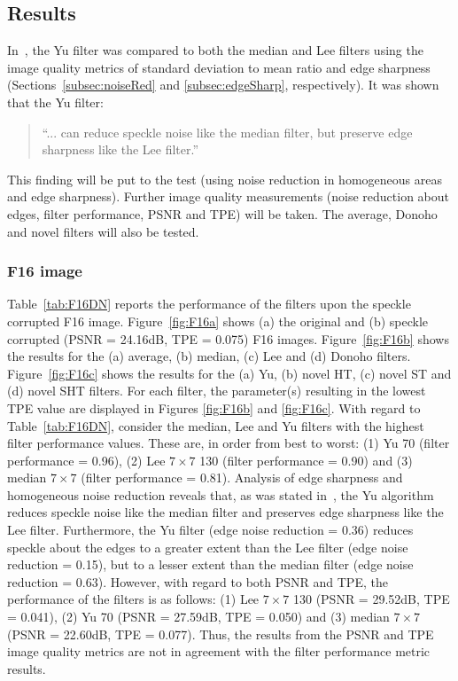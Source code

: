 \documentclass[12pt]{report}
\begin{document}
\subsection{Results}
In~\cite{yu96}, the Yu filter was compared to both the median and Lee filters using the image
quality metrics of standard deviation to mean ratio and edge sharpness (Sections~\ref{subsec:noiseRed} and \ref{subsec:edgeSharp}, respectively).
It was shown that the Yu filter: 
\begin{quote}
``... can reduce speckle noise like the median filter, but preserve edge sharpness like the Lee filter.''
\end{quote}
This finding will be put to the test 
(using noise reduction in homogeneous areas and edge sharpness).
Further image quality measurements 
(noise reduction about edges, filter performance,
PSNR and TPE) will be taken. The average, Donoho and novel filters will also be tested.

\subsubsection{F16 image}
Table~\ref{tab:F16DN} reports the performance of the filters upon the speckle corrupted F16 image.
Figure~\ref{fig:F16a} shows (a) the original and (b) speckle corrupted (PSNR = 24.16dB, TPE = 0.075) F16 images.
Figure~\ref{fig:F16b} shows the results for the (a) average, (b) median, (c) Lee and (d) Donoho filters. 
Figure~\ref{fig:F16c} shows the results for the (a) Yu, (b) novel HT, (c) novel ST and (d) novel SHT filters.
For each filter, the parameter(s) resulting in the lowest TPE value are displayed in 
Figures \ref{fig:F16b} and \ref{fig:F16c}.
With regard to Table~\ref{tab:F16DN}, consider the median, Lee and Yu filters with the highest filter performance values.
These are, in order from best to worst: (1) Yu 70 (filter performance = 0.96), 
(2) Lee $7 \times 7$ 130 (filter performance = 0.90) 
and (3) median $7 \times 7$ (filter performance = 0.81). 
Analysis of edge sharpness and homogeneous noise reduction reveals that, 
as was stated in~\cite{yu96}, the Yu algorithm reduces speckle noise like the median filter
and preserves edge sharpness like the Lee filter. Furthermore, the Yu filter (edge noise reduction = 0.36) 
reduces speckle about the edges to a greater 
extent than the Lee filter (edge noise reduction = 0.15), but to a lesser extent than the 
median filter (edge noise reduction = 0.63).
However, with regard to both PSNR and TPE, the performance of the filters is as follows:
(1) Lee  $7 \times 7$ 130 (PSNR = 29.52dB, TPE = 0.041), 
(2) Yu 70 (PSNR = 27.59dB, TPE = 0.050) and (3) median $7 \times 7$ (PSNR = 22.60dB, TPE = 0.077).
Thus, the results from the 
PSNR and TPE image quality metrics are not in agreement with the filter performance metric results.
\end{document}
